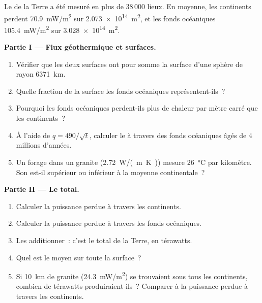 \begin{problem}
\label{pb:g12:internal-heat:1}
Le  de la Terre a été mesuré en plus de 38\,000 lieux. En
moyenne, les continents perdent \qty{70.9}{mW/m^2} sur
\qty{2.073e14}{m^2}, et les fonds océaniques \qty{105.4}{mW/m^2} sur
\qty{3.028e14}{m^2}.

\medskip
\noindent\textbf{Partie I --- Flux géothermique et surfaces.}
\begin{enumerate}
  \item Vérifier que les deux surfaces ont pour somme la surface d'une
        sphère de rayon \qty{6371}{km}.
  \item Quelle fraction de la surface les fonds océaniques
        représentent-ils~?
  \item Pourquoi les fonds océaniques perdent-ils plus de chaleur par mètre
        carré que les continents~?
  \item À l'aide de $q = 490/\sqrt{t}$, calculer le  à
        travers des fonds océaniques âgés de 4 millions d'années.
  \item Un forage dans un granite (\qty{2.72}{W/(m.K)}) mesure
        \qty{26}{\celsius} par kilomètre. Son  est-il
        supérieur ou inférieur à la moyenne continentale~?
\end{enumerate}

\medskip
\noindent\textbf{Partie II --- Le total.}
\begin{enumerate}[resume]
  \item Calculer la puissance perdue à travers les continents.
  \item Calculer la puissance perdue à travers les fonds océaniques.
  \item Les additionner~: c'est le  total de la Terre, en
        térawatts.
  \item Quel est le  moyen sur toute la surface~?
  \item Si \qty{10}{km} de granite (\qty{24.3}{mW/m^2}) se trouvaient sous
        tous les continents, combien de térawatts produiraient-ils~?
        Comparer à la puissance perdue à travers les continents.
\end{enumerate}


\end{problem}
